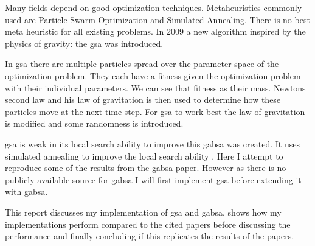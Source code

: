 Many fields depend on good optimization techniques. Metaheuristics commonly used are Particle Swarm Optimization and Simulated Annealing. There is no best meta heuristic for all existing problems. In 2009 a new algorithm inspired by the physics of gravity: the \ac{gsa} was introduced\cite{GSA}. 

In \ac{gsa} there are multiple particles spread over the parameter space of the optimization problem. They each have a fitness given the optimization problem with their individual parameters. We can see that fitness as their mass. Newtons second law and his law of gravitation is then used to determine how these particles move at the next time step. For \ac{gsa} to work best the law of gravitation is modified and some randomness is introduced.

\ac{gsa} is weak in its local search ability to improve this \ac{gabsa} was created. It uses simulated annealing to improve the local search ability \cite{GABSA}. Here I attempt to reproduce some of the results from the \ac{gabsa} paper. However as there is no publicly available source for \ac{gabsa} I will first implement \ac{gsa} before extending it with \ac{gabsa}. 

This report discusses my implementation of \ac{gsa} and \ac{gabsa}, shows how my implementations perform compared to the cited papers before discussing the performance and finally concluding if this replicates the results of the papers.
